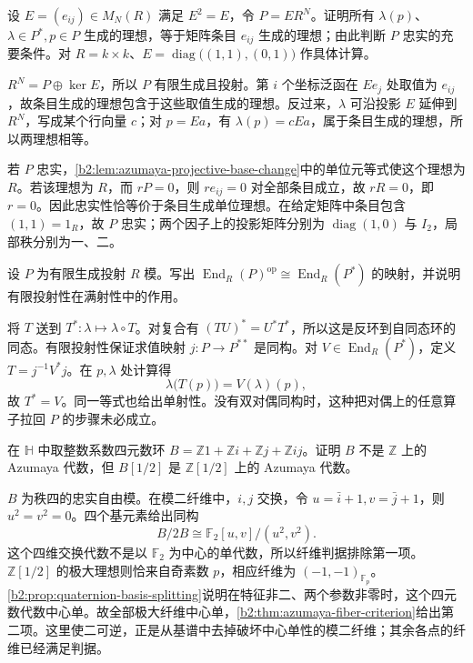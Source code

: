 \begin{exercise}\label{b2:ex:C-faithful-projective-rank}
	设 \(E=(e_{ij})\in M_N(R)\) 满足 \(E^2=E\)，令 \(P=E R^N\)。证明所有 \(\lambda(p)\)、\(\lambda\in P^*,p\in P\) 生成的理想，等于矩阵条目 \(e_{ij}\) 生成的理想；由此判断 \(P\) 忠实的充要条件。对 \(R=k\times k\)、\(E=\operatorname{diag}\bigl((1,1),(0,1)\bigr)\) 作具体计算。
\end{exercise}
\begin{solution}
	\(R^N=P\oplus\ker E\)，所以 \(P\) 有限生成且投射。第 \(i\) 个坐标泛函在 \(Ee_j\) 处取值为 \(e_{ij}\)，故条目生成的理想包含于这些取值生成的理想。反过来，\(\lambda\) 可沿投影 \(E\) 延伸到 \(R^N\)，写成某个行向量 \(c\)；对 \(p=Ea\)，有 \(\lambda(p)=cEa\)，属于条目生成的理想，所以两理想相等。

	若 \(P\) 忠实，\cref{b2:lem:azumaya-projective-base-change}中的单位元等式使这个理想为 \(R\)。若该理想为 \(R\)，而 \(rP=0\)，则 \(r e_{ij}=0\) 对全部条目成立，故 \(rR=0\)，即 \(r=0\)。因此忠实性恰等价于条目生成单位理想。在给定矩阵中条目包含 \((1,1)=1_R\)，故 \(P\) 忠实；两个因子上的投影矩阵分别为 \(\operatorname{diag}(1,0)\) 与 \(I_2\)，局部秩分别为一、二。
\end{solution}

\begin{exercise}\label{b2:ex:C-dual-endomorphism}
	设 \(P\) 为有限生成投射 \(R\) 模。写出 \(\operatorname{End}_R(P)^{\mathrm{op}}\cong\operatorname{End}_R(P^*)\) 的映射，并说明有限投射性在满射性中的作用。
\end{exercise}
\begin{solution}
	将 \(T\) 送到 \(T^*: \lambda\mapsto\lambda\circ T\)。对复合有 \((TU)^*=U^*T^*\)，所以这是反环到自同态环的同态。有限投射性保证求值映射 \(j:P\rightarrow P^{**}\) 是同构。对 \(V\in\operatorname{End}_R(P^*)\)，定义 \(T=j^{-1}V^*j\)。在 \(p,\lambda\) 处计算得
	\[
		\lambda\bigl(T(p)\bigr)=V(\lambda)(p),
	\]
	故 \(T^*=V\)。同一等式也给出单射性。没有双对偶同构时，这种把对偶上的任意算子拉回 \(P\) 的步骤未必成立。
\end{solution}

\begin{exercise}\label{b2:ex:C-integral-quaternions}
	在 \(\mathbb H\) 中取整数系数四元数环 \(B=\mathbb Z1+\mathbb Zi+\mathbb Zj+\mathbb Zij\)。证明 \(B\) 不是 \(\mathbb Z\) 上的 Azumaya 代数，但 \(B[1/2]\) 是 \(\mathbb Z[1/2]\) 上的 Azumaya 代数。
\end{exercise}
\begin{solution}
	\(B\) 为秩四的忠实自由模。在模二纤维中，\(i,j\) 交换，令 \(u=\bar i+1,v=\bar j+1\)，则 \(u^2=v^2=0\)。四个基元素给出同构
	\[
		B/2B\cong\mathbb F_2[u,v]/(u^2,v^2).
	\]
	这个四维交换代数不是以 \(\mathbb F_2\) 为中心的单代数，所以纤维判据排除第一项。\(\mathbb Z[1/2]\) 的极大理想则恰来自奇素数 \(p\)，相应纤维为 \((-1,-1)_{\mathbb F_p}\)。\cref{b2:prop:quaternion-basis-splitting}说明在特征非二、两个参数非零时，这个四元数代数中心单。故全部极大纤维中心单，\cref{b2:thm:azumaya-fiber-criterion}给出第二项。这里使二可逆，正是从基谱中去掉破坏中心单性的模二纤维；其余各点的纤维已经满足判据。
\end{solution}

